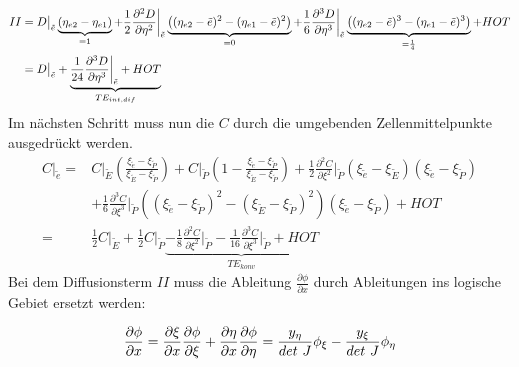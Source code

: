 \begin{align*}
  II&= D\big\vert_{\tilde{e}} \underbrace{(\etaii-\etai)}_{=1} + \frac{1}{2}
  \frac{\partial^2 D}{\partial \eta^2} \bigg\vert_{\tilde{e}}
  \underbrace{\left({(\etaii-\etilde)^2-(\etai-\etilde)^2}\right)}_{=0}
  +\frac{1}{6} \frac{\partial^3 D}{\partial \eta^3}\bigg\vert_{\tilde{e}}
  \underbrace{\left({(\etaii-\etilde)^3-(\etai-\etilde)^3}\right)}_{=\frac{1}{4}} + HOT\\
  &= D \big\vert_{\tilde{e}}+ \underbrace{\frac{1}{24}  \frac{\partial^3 D}{\partial \eta^3}
\bigg\vert_{\tilde{e}}+HOT}_{TE_{int, dif}}
\end{align*}
Im nächsten Schritt muss nun die $C$ durch die umgebenden Zellenmittelpunkte ausgedrückt werden.
\begin{align*}
   C\big\vert_{\tilde{e}}
   =& C\big\vert_{\tilde{E}}
   \left({\frac{\xi_{\tilde{e}}-\xi_{\tilde{P}}}{\xi_{\tilde{E}}-\xi_{\tilde{P}}}}\right)
   + C\big\vert_{\tilde{P}} \left({1-\frac{\xi_{\tilde{e}}-\xi_{\tilde{P}}}{\xi_{\tilde{E}}-\xi_{\tilde{P}}} }\right)
   + \frac{1}{2} \frac{\partial^2 C}{\partial \xi^2}\bigg\vert_{\tilde{P}}
   (\xi_{\tilde{e}}-\xi_{\tilde{E}})(\xi_{\tilde{e}}-\xi_{\tilde{P}})\\
   &+ \frac{1}{6}  \frac{\partial^3 C}{\partial \xi^3}\bigg\vert_{\tilde{P}}
   \left({(\xi_{\tilde{e}}-\xi_{\tilde{P}})^2-(\xi_{\tilde{E}}-\xi_{\tilde{P}})^2}\right)
   (\xi_{\tilde{e}}-\xi_{\tilde{P}}) + HOT\\
   =&\frac{1}{2} C \big\vert_{\tilde{E}} + \frac{1}{2} C \big\vert_{\tilde{P}}
   \underbrace{- \frac{1}{8} \frac{\partial^2 C}{\partial \xi^2}\bigg\vert_{\tilde{P}}
   - \frac{1}{16} \frac{\partial^3 C}{\partial \xi^3}\bigg\vert_{\tilde{P}} + HOT}_{TE_{konv}}
\end{align*}
Bei dem Diffusionsterm $II$ muss die Ableitung $\frac{\partial \phi}{\partial x}$
durch Ableitungen ins logische
Gebiet ersetzt werden:

\begin{equation}
  \pder[\phi]{x}=\pder[\xi]{x}\pder[\phi]{\xi}+\pder[\eta]{x}\pder[\phi]{\eta}
  = \frac{\yeta}{det\ J} \phi_{\xi} - \frac{\yxi}{det\ J} \phi_{\eta}
\end{equation}


